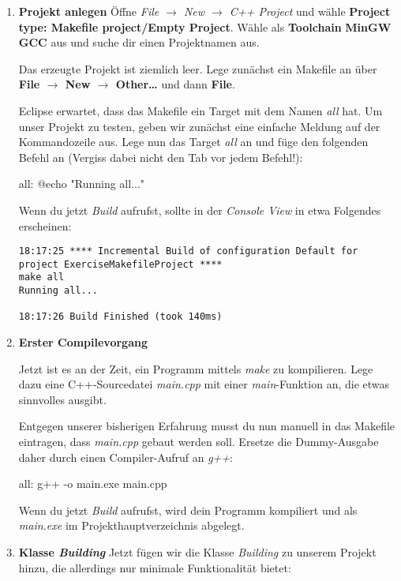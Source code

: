 \documentclass[
  accentcolor=tud1c,	%
  colorbacktitle,		%
  inverttitle,			%
  german,				%
  twoside
]{tudexercise}
\begin{document}
\begin{enumerate}
\item\textbf{Projekt anlegen}
Öffne \emph{File $\to$ New $\to$ C++ Project} und wähle \textbf{Project type: Makefile project/Empty Project}.
Wähle als \textbf{Toolchain} \textbf{MinGW GCC} aus und suche dir einen Projektnamen aus.

Das erzeugte Projekt ist ziemlich leer.
Lege zunächst ein Makefile an über \textbf{File $\to$ New $\to$ Other\dots} und dann \textbf{File}.

Eclipse erwartet, dass das Makefile ein Target mit dem Namen \emph{all} hat.
Um unser Projekt zu testen, geben wir zunächst eine einfache Meldung auf der Kommandozeile aus.
Lege nun das Target \emph{all} an und füge den folgenden Befehl an (Vergiss dabei nicht den Tab vor jedem Befehl!):
\begin{lstmake}
all:	
	@echo "Running all..."
\end{lstmake}

Wenn du jetzt \emph{Build} aufrufst, sollte in der \emph{Console View} in etwa Folgendes erscheinen:
\begin{verbatim}
18:17:25 **** Incremental Build of configuration Default for project ExerciseMakefileProject ****
make all 
Running all...

18:17:26 Build Finished (took 140ms)
\end{verbatim}

\item\textbf{Erster Compilevorgang}

Jetzt ist es an der Zeit, ein Programm mittels \emph{make} zu kompilieren.
Lege dazu eine C++-Sourcedatei \emph{main.cpp} mit einer \emph{main}-Funktion an, die etwas sinnvolles ausgibt.

Entgegen unserer bisherigen Erfahrung musst du nun manuell in das Makefile eintragen, dass \emph{main.cpp} gebaut werden soll.
Ersetze die Dummy-Ausgabe daher durch einen Compiler-Aufruf an \emph{g++}:
\begin{lstmake}
all:
	g++ -o main.exe main.cpp
\end{lstmake}

Wenn du jetzt \emph{Build} aufrufst, wird dein Programm kompiliert und als \emph{main.exe} im Projekthauptverzeichnis abgelegt.

\item\textbf{Klasse \emph{Building}}
Jetzt fügen wir die Klasse \emph{Building} zu unserem Projekt hinzu, die allerdings nur minimale Funktionalität bietet:


\end{enumerate}
\end{document}
